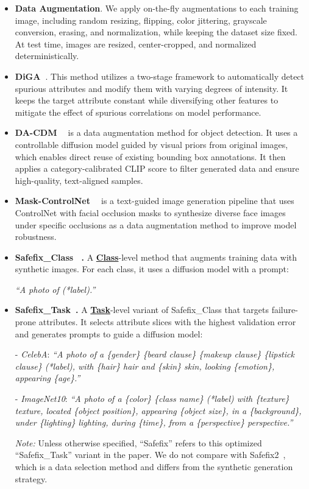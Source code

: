 \documentclass[10pt]{article} %
\newcommand{\hibug}{Safefix\xspace}
\begin{document}
\begin{itemize}
\item \textbf{Data Augmentation}. We apply on-the-fly augmentations to each training image, including random resizing, flipping, color jittering, grayscale conversion, erasing, and normalization, while keeping the dataset size fixed. At test time, images are resized, center-cropped, and normalized deterministically.

\item \textbf{DiGA~\citep{zhang2024distributionally}}. This method utilizes a two-stage framework to automatically detect spurious attributes and modify them with varying degrees of intensity. It keeps the target attribute constant while diversifying other features to mitigate the effect of spurious correlations on model performance.


\item \textbf{DA-CDM ~\citep{fang2024data}} is a data augmentation method for object detection. It uses a controllable diffusion model guided by visual priors from original images, which enables direct reuse of existing bounding box annotations. It then applies a category-calibrated CLIP score to filter generated data and ensure high-quality, text-aligned samples.
\item \textbf{Mask-ControlNet ~\citep{huang2024data}} is a text-guided image generation pipeline that uses ControlNet with facial occlusion masks to synthesize diverse face images under specific occlusions as a data augmentation method to improve model robustness.

    \item \textbf{Safefix\_Class ~\citep{chen2023hibug}.}  
    A \underline{\textbf{Class}}-level method that augments training data with synthetic images. For each class, it uses a diffusion model with a prompt:

    \textit{``A photo of (*label).''}

    \item \textbf{Safefix\_Task~\citep{chen2023hibug}.}  
    A \underline{\textbf{Task}}-level variant of Safefix\_Class that targets failure-prone attributes. It selects attribute slices with the highest validation error and generates prompts to guide a diffusion model:

    - \textit{CelebA}:  
    \textit{``A photo of a \{gender\} \{beard clause\} \{makeup clause\} \{lipstick clause\} (*label), with \{hair\} hair and \{skin\} skin, looking \{emotion\}, appearing \{age\}.''}

    - \textit{ImageNet10}:  
    \textit{``A photo of a \{color\} \{class name\} (*label) with \{texture\} texture, located \{object position\}, appearing \{object size\}, in a \{background\}, under \{lighting\} lighting, during \{time\}, from a \{perspective\} perspective.''}

    \textit{Note:} Unless otherwise specified, ``\hibug'' refers to this optimized ``Safefix\_Task'' variant in the paper. We do not compare with Safefix2~\citep{chen2025hibug2}, which is a data selection method and differs from the synthetic generation strategy.

\end{itemize}
\end{document}
